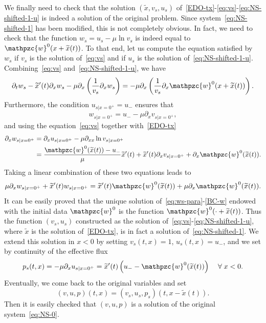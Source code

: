 \documentclass[AHL,Unicode,longabstracts,published]{cedram}
\newcommand{\p}{\partial}
\newcommand{\tw}{\mathpzc{w}}
\newcommand{\tx}{\widetilde{x}}
\let\oldtilde\tilde
\renewcommand*{\tilde}[1]{\mathchoice{\widetilde{#1}}{\widetilde{#1}}{\oldtilde{#1}}{\oldtilde{#1}}}
\let\oldforall\forall
\renewcommand*{\forall}{\mathrel{\oldforall}}
\newcommand{\tx}{\widetilde{x}}
\begin{document}
We finally need to check that the solution $(\tx, v_s, u_s)$ of~\eqref{EDO-tx}-\eqref{eq:vs}-\eqref{eq:NS-shifted-1-u} is indeed a solution of the original problem. Since system~\eqref{eq:NS-shifted-1} has been modified, this is not completely obvious. In fact, we need to check that the function $w_s=u_s-\mu \ln v_s$ is indeed equal to $\tw^0 (x+\tx(t))$. To that end, let us compute the equation satisfied by $w_s$ if $v_s$ is the solution of~\eqref{eq:vs} and if $u_s$ is the solution of~\eqref{eq:NS-shifted-1-u}. Combining~\eqref{eq:vs} and~\eqref{eq:NS-shifted-1-u}, we have
\begin{equation}\label{eq:ws-para}
\p_t w_s - \tilde x'(t) \p_x w_s -\mu \p_x\left(\frac{1}{v_s}\p_x w_s\right)=-\mu \p_x\left(\frac{1}{v_s}\p_x \tw^0(x+\tx(t))\right).
\end{equation}
Furthermore, the condition $u_{s|x=0^+}=u_-$ ensures that
\[
w_{s|x=0^+}= u_-- \mu \p_x v_{s |x=0^+},
\]
and using the equation~\eqref{eq:vs} together with~\eqref{EDO-tx}
\begin{align*}
\p_x w_{s|x=0^+} & = \p_x u_{s|x=0^+} - \mu \p_{xx} \ln v_{s|x=0^+} \\
& = \frac{\tw^0(\tx(t))-u_-}{\mu}\tx'(t) + \tx'(t) \p_x v_{s|x=0^+} + \p_x \tw^0(\tx(t)).
\end{align*}
Taking a linear combination of these two equations leads to
\begin{equation}\label{BC-w}
\mu \p_x w_{s|x=0^+} + \tx'(t) w_{s|x=0^+} = \tx'(t)\tw^0(\tx(t)) + \mu \p_x \tw^0(\tx(t)).
\end{equation}
It can be easily proved that the unique solution of~\eqref{eq:ws-para}-\eqref{BC-w} endowed with the initial data $\tw^0$ is the function $\tw^0(\cdot+\tx(t))$. Thus the function $(v_s,u_s)$ constructed as the solution of~\eqref{eq:vs}-\eqref{eq:NS-shifted-1-u}, where $\tx$ is the solution of~\eqref{EDO-tx}, is in fact a solution of~\eqref{eq:NS-shifted-1}. We extend this solution in $x<0$ by setting $v_s(t,x)=1$, $u_s(t,x)=u_-$, and we set by continuity of the effective flux
\[
p_s(t,x)=-\mu\p_x u_{s|x=0^+}= \tx'(t)\left(u_--\tw^0(\tx(t))\right)\quad \forall x<0.
\]
Eventually, we come back to the original variables and set
\[
(v,u,p)(t,x)=(v_s,u_s,p_s)(t,x-\tx(t)).
\]
Then it is easily checked that $(v,u,p)$ is a solution of the original system~\eqref{eq:NS-0}.
\end{document}
